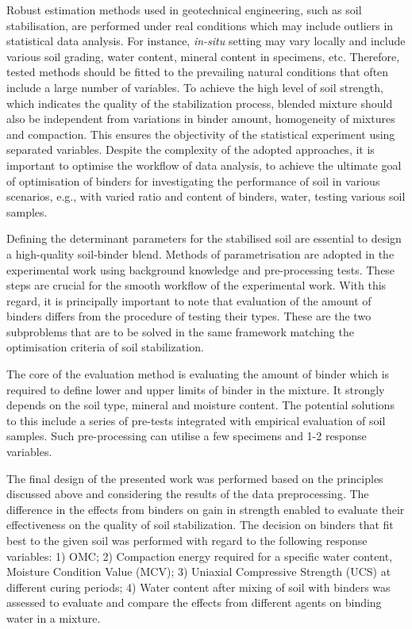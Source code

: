 \documentclass[eprint,
]{actapoly}
\begin{document}
Robust estimation methods used in geotechnical engineering, such as soil stabilisation, are performed under real conditions which may include outliers in statistical data analysis. For instance, \emph{in-situ} setting may vary locally and include various soil grading, water content, mineral content in specimens, etc. Therefore, tested methods should be fitted to the prevailing natural conditions that often include a large number of variables. To achieve the high level of soil strength, which indicates the quality of the stabilization process, blended mixture should also be independent from variations in binder amount, homogeneity of mixtures and compaction. This ensures the objectivity of the statistical experiment using separated variables. Despite the complexity of the adopted approaches, it is important to optimise the workflow of data analysis, to achieve the ultimate goal of optimisation of binders for investigating the performance of soil in various scenarios, e.g., with varied ratio and content of binders, water, testing various soil samples.

Defining the determinant parameters for the stabilised soil are essential to design a high-quality soil-binder blend. Methods of parametrisation are adopted in the experimental work using background knowledge and pre-processing tests. These steps are crucial for the smooth workflow of the experimental work. With this regard, it is principally important to note that evaluation of the amount of binders differs from the procedure of testing their types. These are the two subproblems that are to be solved in the same framework matching the optimisation criteria of soil stabilization. 

The core of the evaluation method is evaluating the amount of binder which is required to define lower and upper limits of binder in the mixture. It strongly depends on the soil type, mineral and moisture content. The potential solutions to this include a series of pre-tests integrated with empirical evaluation of soil samples. Such pre-processing can utilise a few specimens and 1-2 response variables. 

The final design of the presented work was performed based on the principles discussed above and considering the results of the data preprocessing. The difference in the effects from binders on gain in strength enabled to evaluate their effectiveness on the quality of soil stabilization. The decision on binders that fit best to the given soil was performed with regard to the following response variables: 1) OMC; 2) Compaction energy required for a specific water content, Moisture Condition Value (MCV); 3) Uniaxial Compressive Strength (UCS) at different curing periods; 4) Water content after mixing of soil with binders was assessed to evaluate and compare the effects from different agents on binding water in a mixture.
\end{document}
